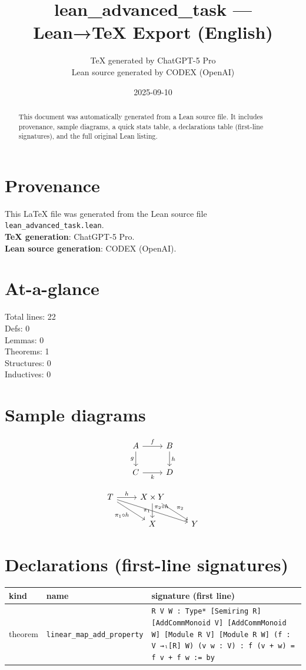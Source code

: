 \documentclass[12pt]{article}
\title{lean\_advanced\_task — Lean→TeX Export (English)}
\author{TeX generated by ChatGPT-5 Pro\\Lean source generated by CODEX (OpenAI)}
\date{2025-09-10}
\begin{document}
\maketitle

\begin{abstract}
This document was automatically generated from a Lean source file. It includes provenance, sample diagrams, a quick stats table, a declarations table (first-line signatures), and the full original Lean listing.
\end{abstract}

\section*{Provenance}
This \LaTeX{} file was generated from the Lean source file \texttt{lean\_advanced\_task.lean}.\\
\textbf{TeX generation}: ChatGPT-5 Pro.\\
\textbf{Lean source generation}: CODEX (OpenAI).

\section*{At-a-glance}
Total lines: 22\\
Defs: 0\\
Lemmas: 0\\
Theorems: 1\\
Structures: 0\\
Inductives: 0

\section*{Sample diagrams}

\[
\begin{tikzcd}
A \arrow[r, "f"] \arrow[d, "g"'] & B \arrow[d, "h"] \\
C \arrow[r, "k"'] & D
\end{tikzcd}
\]



\[
\begin{tikzcd}
T \arrow[r, "h"] \arrow[dr, swap, "\pi_1\circ h"] \arrow[drr, "\pi_2\circ h"] & X\times Y \arrow[d, swap, "\pi_1"] \arrow[dr, "\pi_2"] \\
& X & Y
\end{tikzcd}
\]


\section*{Declarations (first-line signatures)} 
\begin{center}
\begin{tabular}{lll}
\textbf{kind} & \textbf{name} & \textbf{signature (first line)} \\ \hline
theorem & \texttt{linear\_map\_add\_property} & \texttt{{R V W : Type*} [Semiring R] [AddCommMonoid V] [AddCommMonoid W] [Module R V] [Module R W] (f : V →ₗ[R] W) (v w : V) : f (v + w) = f v + f w := by} \\
\end{tabular}
\end{center}
\end{document}
